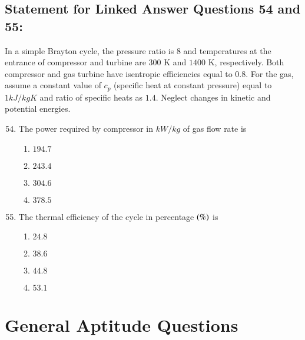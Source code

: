 \documentclass[journal,12pt,onecolumn]{IEEEtran}
\theoremstyle{remark}
\begin{document}
\subsection{\textbf{Statement for Linked Answer Questions 54 and 55:}}
In a simple Brayton cycle, the pressure ratio is $8$ and temperatures at the entrance of compressor and
turbine are $300$ K and $1400$ K, respectively. Both compressor and gas turbine have isentropic efficiencies
equal to $0.8$. For the gas, assume a constant value of $c_p$ (specific heat at constant pressure) equal to $1 kJ/kgK$
and ratio of specific heats as $1.4$. Neglect changes in kinetic and potential energies.\\
\begin{enumerate}\setcounter{enumi}{53}
    \item The power required by compressor in $kW/kg$ of gas flow rate is
    \begin{multicols}{4}
        \begin{enumerate}
            \item $194.7$
            \item $243.4$
            \item $304.6$
            \item $378.5$
        \end{enumerate}
    \end{multicols}
    \item The thermal efficiency of the cycle in percentage $\left(\%\right)$ is
    \begin{multicols}{4}
        \begin{enumerate}
            \item $24.8$
            \item $38.6$
            \item $44.8$
            \item $53.1$
        \end{enumerate}
    \end{multicols}
\end{enumerate}
\section{\textbf{General Aptitude Questions}}
\end{document}
